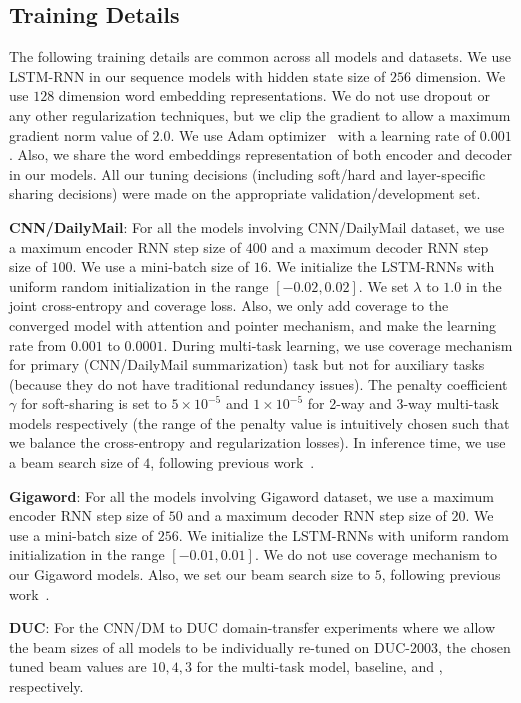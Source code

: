 \documentclass[11pt,a4paper]{article}
\begin{document}
 
 



\subsection{Training Details}
The following training details are common across all models and datasets. 
We use LSTM-RNN in our sequence models with hidden state size of $256$ dimension. We use $128$ dimension word embedding representations. We do not use dropout or any other regularization techniques, but we clip the gradient to allow a maximum gradient norm value of $2.0$.
We use Adam optimizer~\cite{kingma2014adam} with a learning rate of $0.001$.
Also, we share the word embeddings representation of both encoder and decoder in our models. All our tuning decisions (including soft/hard and layer-specific sharing decisions) were made on the appropriate validation/development set.

\noindent\textbf{CNN/DailyMail}: For all the models involving CNN/DailyMail dataset, we use a maximum encoder RNN step size of $400$ and a maximum decoder RNN step size of $100$. We use a mini-batch size of $16$. We initialize the LSTM-RNNs with uniform random initialization in the range $[-0.02,0.02]$. We set $\lambda$ to $1.0$ in the joint cross-entropy and coverage loss. Also, we only add coverage to the converged model with attention and pointer mechanism, and make the learning rate from $0.001$ to $0.0001$. During multi-task learning, we use coverage mechanism for primary (CNN/DailyMail summarization) task but not for auxiliary tasks (because they do not have traditional redundancy issues). The penalty coefficient $\gamma$ for soft-sharing is set to $5\times 10^{-5}$ and $1\times 10^{-5}$ for 2-way and 3-way multi-task models respectively (the range of the penalty value is intuitively chosen such that we balance the cross-entropy and regularization losses). 
In inference time, we use a beam search size of $4$, following previous work~\cite{see2017get}. 

\noindent\textbf{Gigaword}: For all the models involving Gigaword dataset, we use a maximum encoder RNN step size of $50$ and a maximum decoder RNN step size of $20$. We use a mini-batch size of $256$. We initialize the LSTM-RNNs with uniform random initialization in the range $[-0.01,0.01]$. We do not use coverage mechanism to our Gigaword models. Also, we set our beam search size to $5$, following previous work~\cite{nallapati2016abstractive}.

\noindent\textbf{DUC}: For the CNN/DM to DUC domain-transfer experiments where we allow the beam sizes of all models to be individually re-tuned on DUC-2003, the chosen tuned beam values are $10, 4, 3$ for the multi-task model, baseline, and , respectively.
\end{document}
